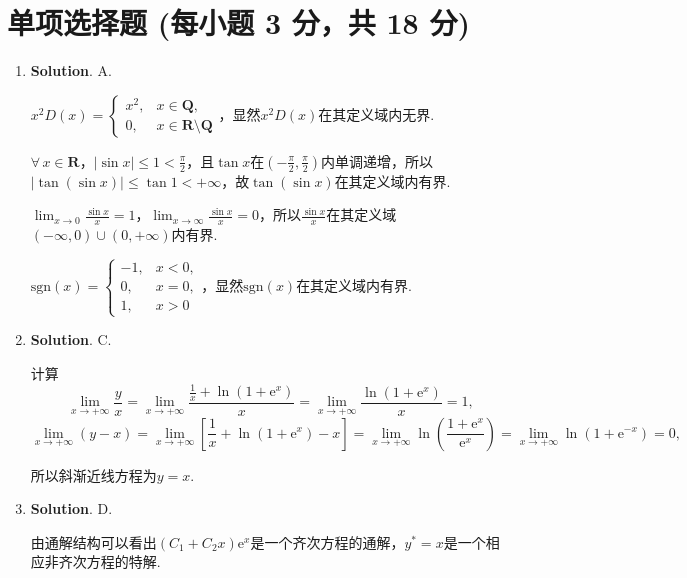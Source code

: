 \documentclass[../main.tex]{subfiles}
\begin{document}
\section{单项选择题 (每小题 3 分，共 18 分)}
\begin{enumerate}
    \item \textbf{Solution}. A.

          $x^{2}D(x)=
              \begin{cases}
                  x^{2}, & x\in\mathbf{Q},                   \\
                  0,     & x\in\mathbf{R}\setminus\mathbf{Q}
              \end{cases}$，显然$x^{2}D(x)$在其定义域内无界.

          $\forall\,x\in\mathbf{R}$，$|\sin x|\leq 1<\frac{\pi}{2}$，且$\tan x$在$\left(-\frac{\pi}{2},\frac{\pi}{2}\right)$内单调递增，所以$|\tan(\sin x)|\leq\tan 1<+\infty$，故$\tan(\sin x)$在其定义域内有界.

          $\lim_{x\to0}\frac{\sin x}{x}=1$，$\lim_{x\to\infty}\frac{\sin x}{x}=0$，所以$\frac{\sin
                  x}{x}$在其定义域$(-\infty,0)\cup(0,+\infty)$内有界.

          $\mathrm{sgn}(x)=
              \begin{cases}
                  -1, & x<0, \\
                  0,  & x=0, \\
                  1,  & x>0
              \end{cases}$，显然$\mathrm{sgn}(x)$在其定义域内有界.

    \item \textbf{Solution}. C.

          计算
          \[
              \lim_{x\to+\infty}\frac{y}{x}=\lim_{x\to+\infty}\frac{\frac{1}{x}+\ln\left(1+\mathrm{e}^{x}\right)}{x}
              =\lim_{x\to+\infty}\frac{\ln\left(1+\mathrm{e}^{x}\right)}{x}=1,
          \]
          \[
              \lim_{x\to+\infty}(y-x)=\lim_{x\to+\infty}\left[\frac{1}{x}+\ln\left(1+\mathrm{e}
                  ^{x}\right)-x\right]=\lim_{x\to+\infty}\ln\left(\frac{1+\mathrm{e}^{x}}{\mathrm{e}^{x}}
              \right)=\lim_{x\to+\infty}\ln\left(1+\mathrm{e}^{-x}\right)=0,
          \]

          所以斜渐近线方程为$y=x$.

    \item \textbf{Solution}. D.

          由通解结构可以看出$(C_{1}+C_{2} x)\mathrm{e}^{x}$是一个齐次方程的通解，$y^{*}
              =x$是一个相应非齐次方程的特解.


\end{enumerate}
\end{document}
